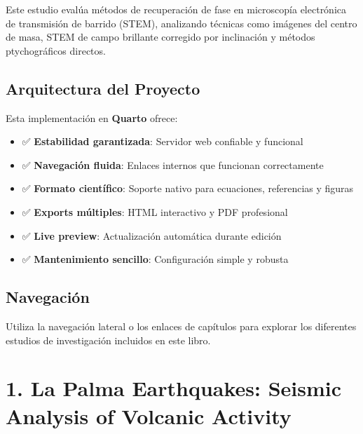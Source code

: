 \documentclass[
  letterpaper,
]{article}
\providecommand{\tightlist}{%
  \setlength{\itemsep}{0pt}\setlength{\parskip}{0pt}}
\begin{document}

Este estudio evalúa métodos de recuperación de fase en microscopía
electrónica de transmisión de barrido (STEM), analizando técnicas como
imágenes del centro de masa, STEM de campo brillante corregido por
inclinación y métodos ptychográficos directos.

\section*{Arquitectura del Proyecto}\label{arquitectura-del-proyecto}


Esta implementación en \textbf{Quarto} ofrece:

\begin{itemize}
\tightlist
\item
  ✅ \textbf{Estabilidad garantizada}: Servidor web confiable y
  funcional
\item
  ✅ \textbf{Navegación fluida}: Enlaces internos que funcionan
  correctamente
\item
  ✅ \textbf{Formato científico}: Soporte nativo para ecuaciones,
  referencias y figuras
\item
  ✅ \textbf{Exports múltiples}: HTML interactivo y PDF profesional
\item
  ✅ \textbf{Live preview}: Actualización automática durante edición
\item
  ✅ \textbf{Mantenimiento sencillo}: Configuración simple y robusta
\end{itemize}

\section*{Navegación}\label{navegaciuxf3n}


Utiliza la navegación lateral o los enlaces de capítulos para explorar
los diferentes estudios de investigación incluidos en este libro.


\chapter{1. La Palma Earthquakes: Seismic Analysis of Volcanic
Activity}\label{la-palma-earthquakes-seismic-analysis-of-volcanic-activity}
\end{document}

